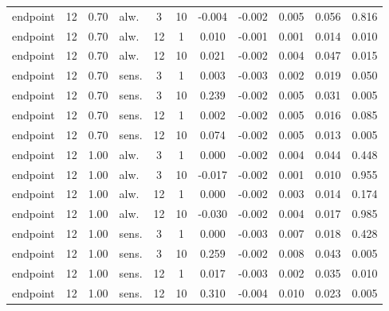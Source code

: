 \documentclass[10pt]{article}
\begin{document}
\begin{scriptsize}
\begin{longtable}{l cclcc ccccc}
endpoint & 12 & 0.70 & alw. & 3 & 10 & -0.004 & -0.002 & 0.005 & 0.056 & 0.816 \\
endpoint & 12 & 0.70 & alw. & 12 & 1 & 0.010 & -0.001 & 0.001 & 0.014 & 0.010 \\
endpoint & 12 & 0.70 & alw. & 12 & 10 & 0.021 & -0.002 & 0.004 & 0.047 & 0.015 \\
endpoint & 12 & 0.70 & sens. & 3 & 1 & 0.003 & -0.003 & 0.002 & 0.019 & 0.050 \\
endpoint & 12 & 0.70 & sens. & 3 & 10 & 0.239 & -0.002 & 0.005 & 0.031 & 0.005 \\
endpoint & 12 & 0.70 & sens. & 12 & 1 & 0.002 & -0.002 & 0.005 & 0.016 & 0.085 \\
endpoint & 12 & 0.70 & sens. & 12 & 10 & 0.074 & -0.002 & 0.005 & 0.013 & 0.005 \\
endpoint & 12 & 1.00 & alw. & 3 & 1 & 0.000 & -0.002 & 0.004 & 0.044 & 0.448 \\
endpoint & 12 & 1.00 & alw. & 3 & 10 & -0.017 & -0.002 & 0.001 & 0.010 & 0.955 \\
endpoint & 12 & 1.00 & alw. & 12 & 1 & 0.000 & -0.002 & 0.003 & 0.014 & 0.174 \\
endpoint & 12 & 1.00 & alw. & 12 & 10 & -0.030 & -0.002 & 0.004 & 0.017 & 0.985 \\
endpoint & 12 & 1.00 & sens. & 3 & 1 & 0.000 & -0.003 & 0.007 & 0.018 & 0.428 \\
endpoint & 12 & 1.00 & sens. & 3 & 10 & 0.259 & -0.002 & 0.008 & 0.043 & 0.005 \\
endpoint & 12 & 1.00 & sens. & 12 & 1 & 0.017 & -0.003 & 0.002 & 0.035 & 0.010 \\
endpoint & 12 & 1.00 & sens. & 12 & 10 & 0.310 & -0.004 & 0.010 & 0.023 & 0.005 \\
\end{longtable}
\end{scriptsize}
\end{document}
